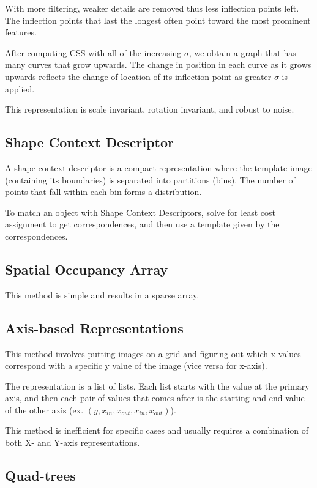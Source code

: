 \documentclass{article}
\begin{document}
\begin{multicols}{3}
With more filtering, weaker details are removed thus less inflection points left. The inflection points that last the longest often point toward the most prominent features.

After computing CSS with all of the increasing $\sigma$, we obtain a graph that has many curves that grow upwards. The change in position in each curve as it grows upwards reflects the change of location of its inflection point as greater $\sigma$ is applied.

This representation is scale invariant, rotation invariant, and robust to noise.

\subsection{Shape Context Descriptor}

A shape context descriptor is a compact representation where the template image (containing its boundaries) is separated into partitions (bins). The number of points that fall within each bin forms a distribution.

To match an object with Shape Context Descriptors, solve for least cost assignment to get correspondences, and then use a template given by the correspondences.

\subsection{Spatial Occupancy Array}

This method is simple and results in a sparse array.

\subsection{Axis-based Representations}

This method involves putting images on a grid and figuring out which x values correspond with a specific y value of the image (vice versa for x-axis). 

The representation is a list of lists. Each list starts with the value at the primary axis, and then each pair of values that comes after is the starting and end value of the other axis (ex. $(y, x_{in}, x_{out}, x_{in}, x_{out})$).

This method is inefficient for specific cases and usually requires a combination of both X- and Y-axis representations.

\subsection{Quad-trees}


\end{multicols}
\end{document}
